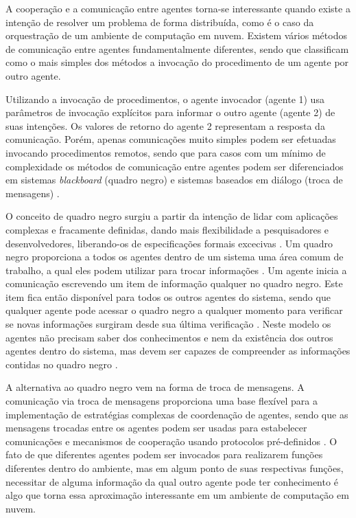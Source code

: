 A cooperação e a comunicação entre agentes torna-se interessante quando existe a intenção de resolver um problema de forma distribuída, como é o caso da orquestração de um ambiente de computação em nuvem. Existem vários métodos de comunicação entre agentes fundamentalmente diferentes, sendo que  classificam como o mais simples dos métodos a invocação do procedimento de um agente por outro agente.

Utilizando a invocação de procedimentos, o agente invocador (agente 1) usa parâmetros de invocação explícitos para informar o outro agente (agente 2) de suas intenções. Os valores de retorno do agente 2 representam a resposta da comunicação. Porém, apenas comunicações muito simples podem ser efetuadas invocando procedimentos remotos, sendo que para casos com um mínimo de complexidade os métodos de comunicação entre agentes podem ser diferenciados em sistemas \emph{blackboard} (quadro negro) e sistemas baseados em diálogo (troca de mensagens) \cite{intelligent}.

O conceito de quadro negro surgiu a partir da intenção de lidar com aplicações complexas e fracamente definidas, dando mais flexibilidade a pesquisadores e desenvolvedores, liberando-os de especificações formais excecivas \cite{blackboard}. Um quadro negro proporciona a todos os agentes dentro de um sistema uma área comum de trabalho, a qual eles podem utilizar para trocar informações \cite{intelligent}. Um agente inicia a comunicação escrevendo um item de informação qualquer no quadro negro. Este item fica então disponível para todos os outros agentes do sistema, sendo que qualquer agente pode acessar o quadro negro a qualquer momento para verificar se novas informações surgiram desde sua última verificação \cite{intelligent}. Neste modelo os agentes não precisam saber dos conhecimentos e nem da existência dos outros agentes dentro do sistema, mas devem ser capazes de compreender as informações contidas no quadro negro \cite{blackboard}.

A alternativa ao quadro negro vem na forma de troca de mensagens. A comunicação via troca de mensagens proporciona uma base flexível para a implementação de estratégias complexas de coordenação de agentes, sendo que as mensagens trocadas entre os agentes podem ser usadas para estabelecer comunicações e mecanismos de cooperação usando protocolos pré-definidos \cite{intelligent}. O fato de que diferentes agentes podem ser invocados para realizarem funções diferentes dentro do ambiente, mas em algum ponto de suas respectivas funções, necessitar de alguma informação da qual outro agente pode ter conhecimento \cite{handbook-intelligence} é algo que torna essa aproximação interessante em um ambiente de computação em nuvem.

